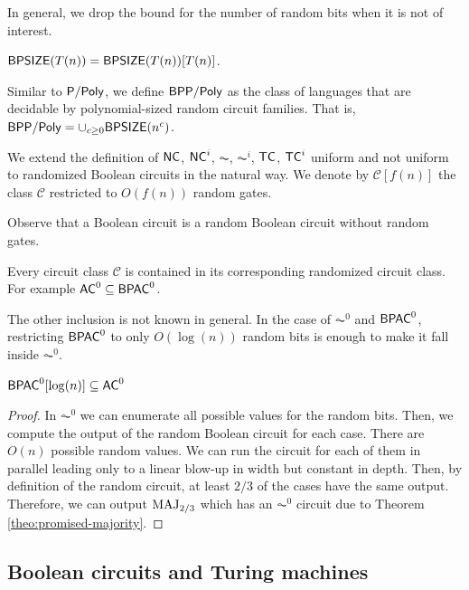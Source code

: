 In general, we drop the bound for the number of random bits when it is not of interest.
\begin{definition}
    $\mathsf{BPSIZE}(T(n)) = \mathsf{BPSIZE}(T(n))[T(n)]$.
\end{definition}


\begin{definition}
    Similar to $\mathsf{P/Poly}$, we define $\mathsf{BPP/Poly}$ as the class of languages that are decidable by polynomial-sized random circuit families.
    That is, $\mathsf{BPP/Poly} = \cup_{c\ge0} \mathsf{BPSIZE}(n^c)$.
\end{definition}

We extend the definition of $\mathsf{NC}$, $\mathsf{NC}^i$, $\AC$, $\AC^i$, $\mathsf{TC}$, $\mathsf{TC}^i$ uniform and not uniform to randomized Boolean circuits in the natural way.
We denote by $\mathcal{C}[f(n)]$ the class $\mathcal{C}$ restricted to $O(f(n))$ random gates.

Observe that a Boolean circuit is a random Boolean circuit without random gates.

\begin{theorem}
    Every circuit class $\mathcal{C}$ is contained in its corresponding randomized circuit class.
    For example $\mathsf{AC}^0 \subseteq \mathsf{BPAC}^0$.
\end{theorem}

The other inclusion is not known in general.
In the case of $\AC^0$ and $\mathsf{BPAC}^0$, restricting $\mathsf{BPAC}^0$ to only $O(\log(n))$ random bits is enough to make it fall inside $\AC^0$.
\begin{theorem}\label{const-random-in-ac0}
    $\mathsf{BPAC}^0[\log(n)] \subseteq \mathsf{AC}^0$
\end{theorem}

\begin{proof}
    In $\AC^0$ we can enumerate all possible values for the random bits.
    Then, we compute the output of the random Boolean circuit for each case.
    There are $O(n)$ possible random values.
    We can run the circuit for each of them in parallel leading only to a linear blow-up in width but constant in depth.
    Then, by definition of the random circuit, at least $2/3$ of the cases have the same output.
    Therefore, we can output $\text{MAJ}_{2/3}$ which has an $\AC^0$ circuit due to Theorem \ref{theo:promised-majority}.
\end{proof}



\subsection{Boolean circuits and Turing machines}

